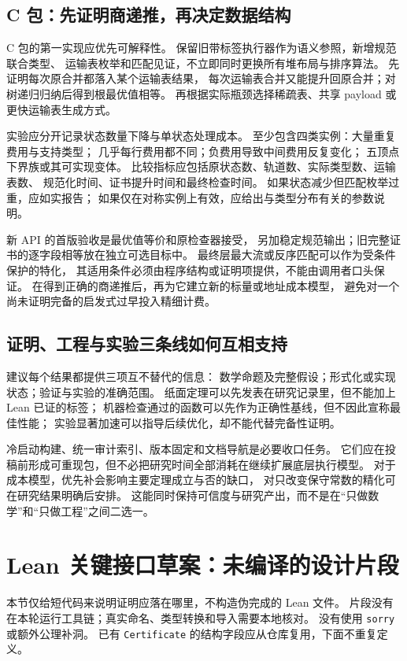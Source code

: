 \documentclass[UTF8,a4paper,11pt,fontset=fandol]{ctexart}
\theoremstyle{definition}
\newcommand{\repo}[1]{\nolinkurl{#1}}
\begin{document}
\subsection{C 包：先证明商递推，再决定数据结构}

C 包的第一实现应优先可解释性。
保留旧带标签执行器作为语义参照，新增规范联合类型、
运输表枚举和匹配见证，不立即同时更换所有堆布局与排序算法。
先证明每次原合并都落入某个运输表结果，
每次运输表合并又能提升回原合并；对树递归归纳后得到根最优值相等。
再根据实际瓶颈选择稀疏表、共享 payload 或更快运输表生成方式。

实验应分开记录状态数量下降与单状态处理成本。
至少包含四类实例：大量重复费用与支持类型；
几乎每行费用都不同；负费用导致中间费用反复变化；
五顶点下界族或其可实现变体。
比较指标应包括原状态数、轨道数、实际类型数、运输表数、
规范化时间、证书提升时间和最终检查时间。
如果状态减少但匹配枚举过重，应如实报告；
如果仅在对称实例上有效，应给出与类型分布有关的参数说明。

新 API 的首版验收是最优值等价和原检查器接受，
另加稳定规范输出；旧完整证书的逐字段相等放在独立可选目标中。
最终层最大流或反序匹配可以作为受条件保护的特化，
其适用条件必须由程序结构或证明项提供，不能由调用者口头保证。
在得到正确的商递推后，再为它建立新的标量或地址成本模型，
避免对一个尚未证明完备的启发式过早投入精细计费。

\subsection{证明、工程与实验三条线如何互相支持}

建议每个结果都提供三项互不替代的信息：
数学命题及完整假设；形式化或实现状态；验证与实验的准确范围。
纸面定理可以先发表在研究记录里，但不能加上 Lean 已证的标签；
机器检查通过的函数可以先作为正确性基线，但不因此宣称最佳性能；
实验显著加速可以指导后续优化，却不能代替完备性证明。

冷启动构建、统一审计索引、版本固定和文档导航是必要收口任务。
它们应在投稿前形成可重现包，但不必把研究时间全部消耗在继续扩展底层执行模型。
对于成本模型，优先补会影响主要定理成立与否的缺口，
对只改变保守常数的精化可在研究结果明确后安排。
这能同时保持可信度与研究产出，而不是在“只做数学”和“只做工程”之间二选一。

\section{Lean 关键接口草案：未编译的设计片段}\label{sec:lean}

本节仅给短代码来说明证明应落在哪里，不构造伪完成的 Lean 文件。
片段没有在本轮运行工具链；真实命名、类型转换和导入需要本地核对。
没有使用 \repo{sorry} 或额外公理补洞。
已有 \repo{Certificate} 的结构字段应从仓库复用，下面不重复定义。
\end{document}

